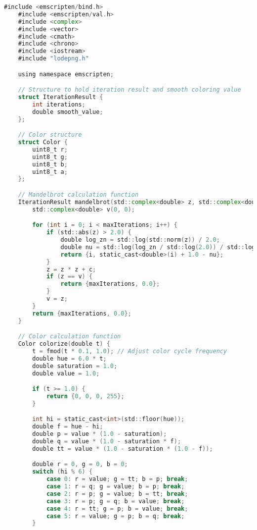 \begin{lstlisting}[language=go, frame=tb, caption={Mandelbrot Set Calculation: C++ (WASM build)}]
    #include <emscripten/bind.h>
    #include <emscripten/val.h>
    #include <complex>
    #include <vector>
    #include <cmath>
    #include <chrono>
    #include <iostream>
    #include "lodepng.h"

    using namespace emscripten;

    // Structure to hold iteration result and smooth coloring value
    struct IterationResult {
        int iterations;
        double smooth_value;
    };

    // Color structure
    struct Color {
        uint8_t r;
        uint8_t g;
        uint8_t b;
        uint8_t a;
    };

    // Mandelbrot calculation function
    IterationResult mandelbrot(std::complex<double> z, std::complex<double> c, int maxIterations) {
        std::complex<double> v(0, 0);

        for (int i = 0; i < maxIterations; i++) {
            if (std::abs(z) > 2.0) {
                double log_zn = std::log(std::norm(z)) / 2.0;
                double nu = std::log(log_zn / std::log(2.0)) / std::log(2.0);
                return {i, static_cast<double>(i) + 1.0 - nu};
            }
            z = z * z + c;
            if (z == v) {
                return {maxIterations, 0.0};
            }
            v = z;
        }
        return {maxIterations, 0.0};
    }

    // Color calculation function
    Color colorize(double t) {
        t = fmod(t * 0.1, 1.0); // Adjust color cycle frequency
        double hue = 6.0 * t;
        double saturation = 1.0;
        double value = 1.0;

        if (t >= 1.0) {
            return {0, 0, 0, 255};
        }

        int hi = static_cast<int>(std::floor(hue));
        double f = hue - hi;
        double p = value * (1.0 - saturation);
        double q = value * (1.0 - saturation * f);
        double tt = value * (1.0 - saturation * (1.0 - f));

        double r = 0, g = 0, b = 0;
        switch (hi % 6) {
            case 0: r = value; g = tt; b = p; break;
            case 1: r = q; g = value; b = p; break;
            case 2: r = p; g = value; b = tt; break;
            case 3: r = p; g = q; b = value; break;
            case 4: r = tt; g = p; b = value; break;
            case 5: r = value; g = p; b = q; break;
        }


\end{lstlisting}
